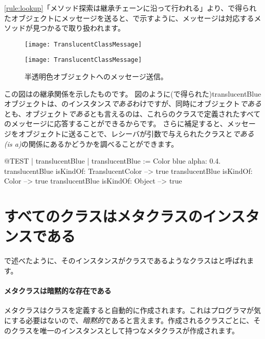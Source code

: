 \documentclass[a4paper,10pt,twoside]{book}
\begin{document}
\ref{rule:lookup}「メソッド探索は継承チェーンに沿って行われる」より、で得られたオブジェクトにメッセージを送ると、で示すように、メッセージは対応するメソッドが見つかるで取り扱われます。

\begin{center}
\begin{figure}[!ht]
\ifluluelse
	{\centerline{\texttt{[image: TranslucentClassMessage]}}}
	{\centerline{\texttt{[image: TranslucentClassMessage]}}}
\caption{半透明色オブジェクトへのメッセージ送信。}
\end{figure}
\end{center}

この図はの継承関係を示したものです。
図のように(で得られた)translucentBlueオブジェクトは、のインスタンス\emph{である}わけですが、同時にオブジェクト\emph{である}とも、オブジェクト\emph{である}とも言えるのは、これらのクラスで定義されたすべてのメッセージに応答することができるからです。
さらに補足すると、メッセージをオブジェクトに送ることで、レシーバが引数で与えられたクラスと\emph{である(is a)}の関係にあるかどうかを調べることができます。
\begin{code}{@TEST | translucentBlue |}
translucentBlue := Color blue alpha: 0.4.
translucentBlue isKindOf: TranslucentColor --> true
translucentBlue isKindOf: Color                    --> true
translucentBlue isKindOf: Object                  --> true
\end{code}

\section{すべてのクラスはメタクラスのインスタンスである}


で述べたように、そのインスタンスがクラスであるようなクラスはと呼ばれます。

\paragraph{メタクラスは暗黙的な存在である}
メタクラスはクラスを定義すると自動的に作成されます。これはプログラマが気にする必要はないので、\emph{暗黙的}であると言えます。作成されるクラスごとに、そのクラスを唯一のインスタンスとして持つなメタクラスが作成されます。
\end{document}
